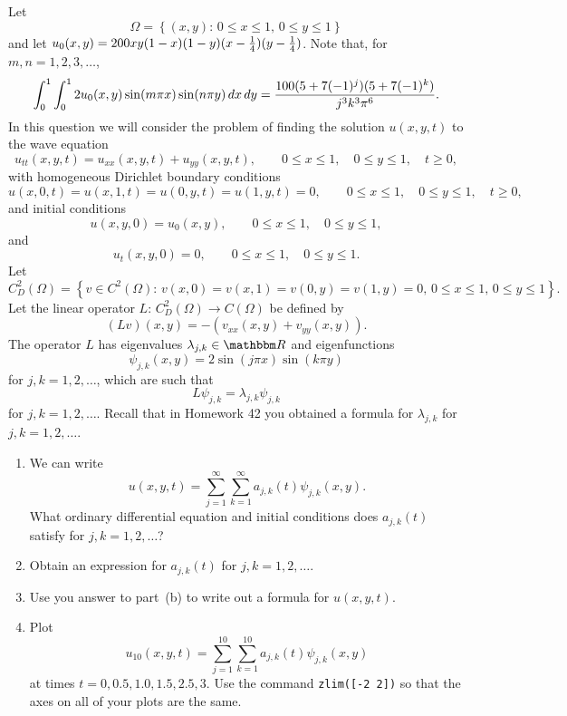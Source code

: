 
Let
\[
\Omega=\left\{(x,y):\,0\le x\le 1,\,0\le y\le 1\right\}
\]
and let $u_0(x,y) = 200xy (1-x) (1-y)(x-{1 \over 4})(y-{1 \over 4})$. Note that, for $m,n=1,2,3,\ldots$,
\[
\int_0^1 \int_0^1 2 u_0(x,y) \sin(m \pi x) \sin(n \pi y)\,dx\,dy= {100 (5+7(-1)^j)(5+7(-1)^k)\over j^3 k^3 \pi^6}.
\]
In this question we will consider the problem of finding the solution $u(x,y,t)$ to the wave equation
\[ 
u_{tt}(x,y,t)=u_{xx}(x,y,t) +u_{yy}(x,y,t), \qquad 0\le x \le 1, \quad 0\le y\le 1, \quad t\ge 0,
\]
with homogeneous Dirichlet boundary conditions
\[
u(x,0,t)=u(x,1,t)=u(0,y,t)=u(1,y,t)=0, \qquad 0\le x \le 1, \quad 0\le y\le 1, \quad t\ge 0,
\]
and initial conditions
\[
u(x,y,0) = u_0(x,y), \qquad 0\le x\le 1, \quad 0\le y\le 1,
\]
and
\[
u_t(x,y,0) = 0, \qquad 0\le x\le 1, \quad 0\le y\le 1.
\]
Let
\[
C^2_D(\Omega)=\left\{v\in C^2(\Omega):\,v(x,0)=v(x,1)=v(0,y)=v(1,y)=0,\,0\le x\le 1,\,0\le y\le 1\right\}.
\]
Let the linear operator $L:\,C^2_D(\Omega)\rightarrow C(\Omega)$ be defined by
\[
\left(L v\right)(x,y) = -\left(v_{xx}(x,y) + v_{yy}(x,y)\right).
\]
The operator $L$ has eigenvalues $\lambda_{j,k}\in\R$ and eigenfunctions
\[
\psi_{j,k}(x,y) = 2 \sin(j \pi x) \sin(k \pi y)
\]
for $j,k = 1,2,\ldots$, which are such that
\[
L\psi_{j,k}=\lambda_{j,k}\psi_{j,k}
\]
for $j,k = 1,2,\ldots$. Recall that in Homework 42 you obtained a formula for $\lambda_{j,k}$ for $j,k = 1,2,\ldots$.
\\
\begin{enumerate}
\item We can write
\[
u(x,y,t)=\sum_{j=1}^\infty \sum_{k=1}^\infty a_{j,k}(t) \psi_{j,k}(x,y).
\]
What ordinary differential equation and initial conditions does $a_{j,k}(t)$ satisfy for $j,k = 1,2,\ldots$?
\\
\item Obtain an expression for $a_{j,k}(t)$ for $j,k=1,2,\ldots$.
\\
\item Use you answer to part~(b) to write out a formula for $u(x,y,t)$.
\\
\item Plot
\[
u_{10}(x,y,t)=\sum_{j=1}^{10} \sum_{k=1}^{10} a_{j,k}(t) \psi_{j,k}(x,y)
\]
at times $t=0, 0.5, 1.0, 1.5, 2.5, 3$. Use the command \verb|zlim([-2 2])| so that the axes on all of your plots are the same.
\end{enumerate}




